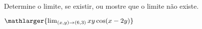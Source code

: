 Determine o limite, se existir, ou mostre que o limite não existe.

$\mathlarger{\lim_{(x,y)\rightarrow(6,3)} xy \cos(x-2y)}$

